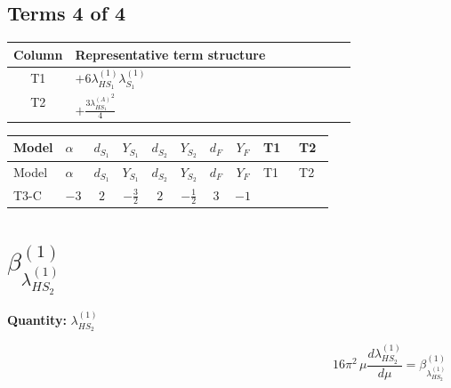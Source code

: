 \documentclass[8pt]{article}
\begin{document}
\begin{landscape}
\subsection*{Terms 4 of 4}
\begin{center}
\begin{tabular}{@{}c >{\raggedright\arraybackslash}p{0.82\linewidth}@{}}
\toprule
Column & Representative term structure \\
\midrule
T1 & \(\displaystyle +6 {\lambda_{HS_1}^{(1)}} {\lambda_{S_1}^{(1)}}\) \\
\midrule
T2 & \(\displaystyle +\frac{3 {\lambda_{HS_1}^{(A)}}^2}{4}\) \\
\midrule
\bottomrule
\end{tabular}
\end{center}
\smallskip
\tiny
\begin{longtable}{@{}llcccccc >{\raggedright\arraybackslash}p{0.21\linewidth} >{\raggedright\arraybackslash}p{0.21\linewidth}@{}}
\toprule
Model & $\alpha$ & $d_{S_1}$ & $Y_{S_1}$ & $d_{S_2}$ & $Y_{S_2}$ & $d_F$ & $Y_F$ & T1 & T2 \\
\midrule
\endfirsthead
\toprule
Model & $\alpha$ & $d_{S_1}$ & $Y_{S_1}$ & $d_{S_2}$ & $Y_{S_2}$ & $d_F$ & $Y_F$ & T1 & T2 \\
\midrule
\endhead
T3-C & $-3$ & $2$ & $-\frac{3}{2}$ & $2$ & $-\frac{1}{2}$ & $3$ & $-1$ & \scriptsize\adjustbox{max width=\linewidth}{$\begin{gathered} +6 {\lambda_{HS_1}^{(1)}} {\lambda_{S_1}^{(1)}}\end{gathered}$} & \scriptsize\adjustbox{max width=\linewidth}{$\begin{gathered} +\frac{3 {\lambda_{HS_1}^{(A)}}^2}{4}\end{gathered}$} \\
\midrule
\bottomrule
\end{longtable}
\clearpage
\section*{$\beta_{\lambda_{HS_2}^{(1)}}^{(1)}$}
\noindent\textbf{Quantity: }$\lambda_{HS_2}^{(1)}$\par\smallskip
\[16\pi^2\,\mu\frac{d \lambda_{HS_2}^{(1)}}{d\mu}=\beta_{\lambda_{HS_2}^{(1)}}^{(1)}\]

\end{landscape}
\end{document}
